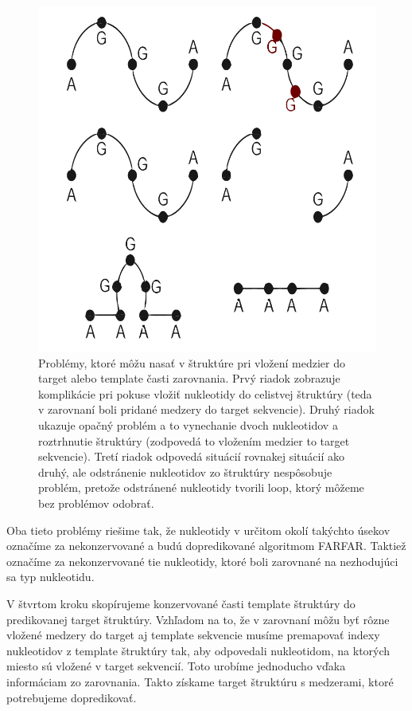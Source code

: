 \begin{figure}%
\includegraphics[width=\textwidth]{../img/aln-problems}
\caption{Problémy, ktoré môžu nasať v štruktúre pri vložení medzier do target alebo template časti zarovnania. Prvý riadok zobrazuje komplikácie pri pokuse vložiť nukleotidy do celistvej štruktúry (teda v zarovnaní boli pridané medzery do target sekvencie). Druhý riadok ukazuje opačný problém a to vynechanie dvoch nukleotidov a roztrhnutie štruktúry (zodpovedá to vložením medzier to target sekvencie). Tretí riadok odpovedá situácií rovnakej situácií ako druhý, ale odstránenie nukleotidov zo štruktúry nespôsobuje problém, pretože odstránené nukleotidy tvorili loop, ktorý môžeme bez problémov odobrať.}
\label{obr3.1:indels}
\end{figure}

Oba tieto problémy riešime tak, že nukleotidy v určitom okolí takýchto úsekov označíme za nekonzervované a budú dopredikované algoritmom FARFAR.
Taktiež označíme za nekonzervované tie nukleotidy, ktoré boli zarovnané na nezhodujúci sa typ nukleotidu. 


\indent V štvrtom kroku skopírujeme konzervované časti template štruktúry do predikovanej target štruktúry. Vzhľadom na to, že v zarovnaní môžu byť rôzne vložené medzery do target aj template sekvencie musíme premapovať indexy nukleotidov z template štruktúry tak, aby odpovedali nukleotidom, na ktorých miesto sú vložené v target sekvencií. Toto urobíme jednoducho vďaka informáciam zo zarovnania. Takto získame target štruktúru s medzerami, ktoré potrebujeme dopredikovať.


